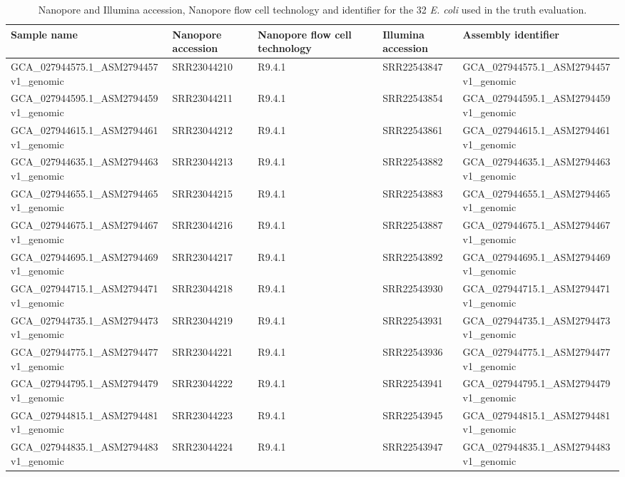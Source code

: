 \begin{sidewaystable}[ht]
\centering
\small
\caption{Nanopore and Illumina accession, Nanopore flow cell technology and identifier for the 32 \textit{E. coli} used in the truth evaluation.}
\begin{tabular}{|l|l|l|l|l|}
\hline
\textbf{Sample name} & \textbf{Nanopore accession} & \textbf{Nanopore flow cell technology} & \textbf{Illumina accession} & \textbf{Assembly identifier} \\ \hline
GCA\_027944575.1\_ASM2794457v1\_genomic & SRR23044210 & R9.4.1 & SRR22543847 & GCA\_027944575.1\_ASM2794457v1\_genomic \\ \hline
GCA\_027944595.1\_ASM2794459v1\_genomic & SRR23044211 & R9.4.1 & SRR22543854 & GCA\_027944595.1\_ASM2794459v1\_genomic \\ \hline
GCA\_027944615.1\_ASM2794461v1\_genomic & SRR23044212 & R9.4.1 & SRR22543861 & GCA\_027944615.1\_ASM2794461v1\_genomic \\ \hline
GCA\_027944635.1\_ASM2794463v1\_genomic & SRR23044213 & R9.4.1 & SRR22543882 & GCA\_027944635.1\_ASM2794463v1\_genomic \\ \hline
GCA\_027944655.1\_ASM2794465v1\_genomic & SRR23044215 & R9.4.1 & SRR22543883 & GCA\_027944655.1\_ASM2794465v1\_genomic \\ \hline
GCA\_027944675.1\_ASM2794467v1\_genomic & SRR23044216 & R9.4.1 & SRR22543887 & GCA\_027944675.1\_ASM2794467v1\_genomic \\ \hline
GCA\_027944695.1\_ASM2794469v1\_genomic & SRR23044217 & R9.4.1 & SRR22543892 & GCA\_027944695.1\_ASM2794469v1\_genomic \\ \hline
GCA\_027944715.1\_ASM2794471v1\_genomic & SRR23044218 & R9.4.1 & SRR22543930 & GCA\_027944715.1\_ASM2794471v1\_genomic \\ \hline
GCA\_027944735.1\_ASM2794473v1\_genomic & SRR23044219 & R9.4.1 & SRR22543931 & GCA\_027944735.1\_ASM2794473v1\_genomic \\ \hline
GCA\_027944775.1\_ASM2794477v1\_genomic & SRR23044221 & R9.4.1 & SRR22543936 & GCA\_027944775.1\_ASM2794477v1\_genomic \\ \hline
GCA\_027944795.1\_ASM2794479v1\_genomic & SRR23044222 & R9.4.1 & SRR22543941 & GCA\_027944795.1\_ASM2794479v1\_genomic \\ \hline
GCA\_027944815.1\_ASM2794481v1\_genomic & SRR23044223 & R9.4.1 & SRR22543945 & GCA\_027944815.1\_ASM2794481v1\_genomic \\ \hline
GCA\_027944835.1\_ASM2794483v1\_genomic & SRR23044224 & R9.4.1 & SRR22543947 & GCA\_027944835.1\_ASM2794483v1\_genomic \\ \hline

\end{tabular}
\end{sidewaystable}
